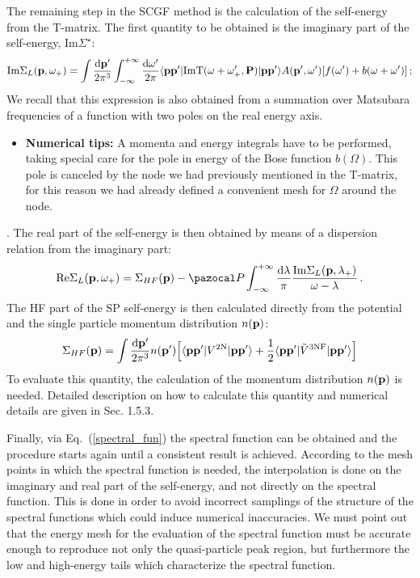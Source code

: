  The remaining step in the SCGF method is the calculation of the self-energy from the T-matrix. The first quantity to be obtained is the imaginary part of the self-energy, Im$\Sigma^\star$:
\begin{equation}
{\rm Im}\Sigma_L({\bf p},\omega_+)=\int\frac{{\rm d}{\bf p'}}{2\pi^3}\int_{-\infty}^{+\infty}\frac{{\rm d}{\omega'}}{2\pi}\langle{\bf pp'}|{\rm Im}{\rm T}(\omega+\omega'_+,{\bf P})|{\bf pp'}\rangle A({\bf p'},\omega')[f(\omega')+b(\omega+\omega')]\,;
\end{equation}
We recall that this expression is also obtained from a summation over Matsubara frequencies of a function with two poles on the real energy axis. 
\begin{itemize}
\item {\bf Numerical tips:} A momenta and energy integrals have to be performed, taking special care for the pole in energy of the Bose function $b(\Omega)$. This pole is canceled by the node we had previously mentioned in the T-matrix, for this reason we had already defined a convenient mesh for $\Omega$ around the node. 
\end{itemize}
 
. The real part of the self-energy is then obtained by means of a dispersion relation from the imaginary part: 
\begin{equation}
{\rm Re}\Sigma_L({\bf p},\omega_+)=\Sigma_{HF}({\bf p})-{\pazocal P}\int_{-\infty}^{+\infty}\frac{{\rm d}{\lambda}}{\pi}\frac{{\rm Im}\Sigma_L({\bf p},\lambda_+)}{\omega-\lambda}\,.
\end{equation}
The HF part of the SP self-energy is then calculated directly from the potential and the single particle momentum distribution $n({\bf p})$:
\begin{equation}
\label{HF_self}
\Sigma_{HF}({\bf p})=\int\frac{{\rm d}{\bf p'}}{2\pi^3}n({\bf p'})\Big[\langle{\bf pp'}|V^{\rm 2N}|{\bf pp'}\rangle +\frac{1}{2}\langle{\bf pp'}|\tilde V^{\rm 3NF}|{\bf pp'}\rangle\Big] 
\end{equation}
To evaluate this quantity, the calculation of the momentum distribution $n({\bf p})$ is needed. Detailed description on how to calculate this quantity and numerical details are given in Sec. 1.5.3. 

Finally, via Eq.~(\ref{spectral_fun}) the spectral function can be obtained and the procedure starts again until a consistent result is achieved. According to the mesh points in which the spectral function is needed, the interpolation is done on the imaginary and real part of the self-energy, and not directly on the spectral function. This is done in order to avoid incorrect samplings of the structure of the spectral functions which could induce numerical inaccuracies. We must point out that the energy mesh for the evaluation of the spectral function must be accurate enough to reproduce not only the quasi-particle peak region, but furthermore the low and high-energy tails which characterize the spectral function.   

